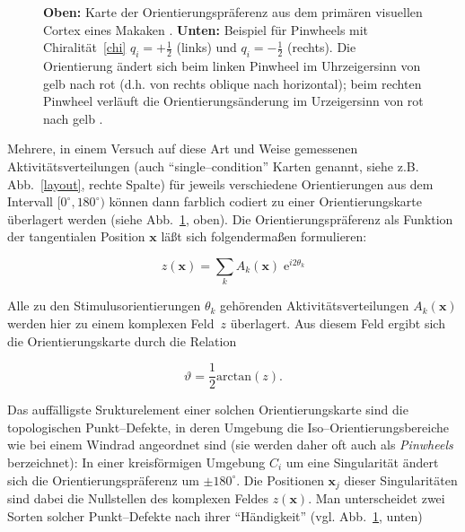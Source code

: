 \begin{figure}[t]
\centering
\begin{minipage}{10cm}
\end{minipage}
\vskip0.5cm
\begin{minipage}[b]{4cm}
\end{minipage}
\caption{\textbf{Oben:} Karte der Orientierungspräferenz aus dem primären
visuellen Cortex eines Makaken \protect{}.
\textbf{Unten:} Beispiel für Pinwheels mit Chiralität~\eqref{chi}
$q_i=+\frac{1}{2}$ (links) und $q_i=-\frac{1}{2}$ (rechts). Die
Orientierung ändert sich beim linken Pinwheel im Uhrzeigersinn von gelb
nach rot (d.h. von rechts oblique nach horizontal); beim rechten Pinwheel
verläuft die Orientierungsänderung im Urzeigersinn von rot nach gelb
\protect{}.}
\label{opblasdel}
\end{figure}

Mehrere, in einem Versuch auf diese Art und Weise gemessenen
Aktivitäts\-ver\-tei\-lungen (auch ``single--condition'' Karten genannt, siehe
z.B. Abb.~\ref{layout}, rechte Spalte) für jeweils verschiedene
Orientierungen aus dem Intervall $[0^\circ,180^\circ)$ können dann
farblich codiert zu einer Orientierungskarte überlagert werden (siehe
Abb.~\ref{opblasdel}, oben).  Die Orientierungspräferenz als Funktion der
tangentialen Position $\mathbf{x}$ läßt sich folgendermaßen formulieren:

\begin{equation*}
z(\mathbf{x})=\sum\limits_k A_k(\mathbf{x})\; \text{e}^{i2\theta_k}
\label{zfeld}
\end{equation*}

Alle zu den Stimulusorientierungen $\theta_k$ gehörenden
Aktivitätsverteilungen $A_k(\mathbf{x})$ werden hier zu einem komplexen
Feld~$z$ überlagert.  Aus diesem Feld ergibt sich die Orientierungskarte
durch die Relation

\begin{equation*}
\vartheta=\frac{1}{2}\text{arctan}(z).
\end{equation*}

Das auffälligste Srukturelement einer solchen Orientierungskarte sind die
topologischen Punkt--Defekte, in deren Umgebung die
Iso--Orientierungsbereiche wie bei einem Windrad angeordnet sind (sie
werden daher oft auch als \emph{Pinwheels} berzeichnet): In einer
kreisförmigen Umgebung $C_i$ um eine Singularität ändert sich die
Orientierungspräferenz um $\pm 180^\circ$.  Die Positionen $\mathbf{x}_j$
dieser Singularitäten sind dabei die Nullstellen des komplexen Feldes
$z(\mathbf{x})$. Man unterscheidet zwei Sorten solcher Punkt--Defekte nach
ihrer ``Händigkeit'' (vgl. Abb.~\ref{opblasdel}, unten)

